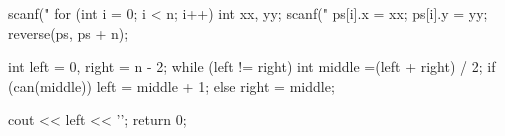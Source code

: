 \documentclass[12pt, titlepage]{article}
\begin{document}
\begin{cppcode}
{    scanf("%
    for (int i = 0; i < n; i++) {
        int xx, yy;
        scanf("%
        ps[i].x = xx;
        ps[i].y = yy;
    }
    reverse(ps, ps + n);
   
    int left = 0, right = n - 2;
    while (left != right) {
        int middle =(left + right) / 2;
        if (can(middle))
            left = middle + 1;
        else
            right = middle;
    }

    cout << left << '\n';
    return 0;
}
\end{cppcode}
\end{document}
